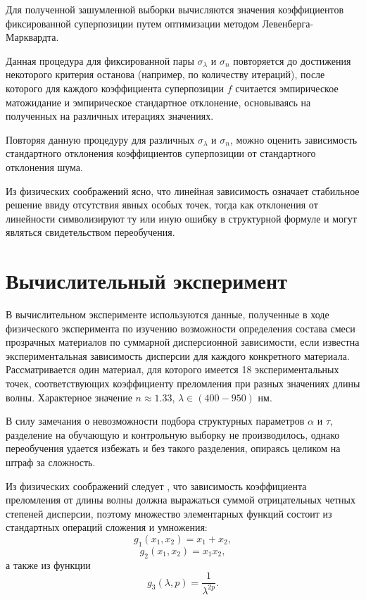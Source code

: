 \documentclass[12pt,a4paper]{article}
\begin{document}
Для полученной зашумленной выборки вычисляются значения коэффициентов фиксированной
суперпозиции путем оптимизации методом Левенберга-Марквардта.

Данная процедура для фиксированной пары $\sigma_{\lambda}$ и $\sigma_n$ повторяется
до достижения некоторого критерия останова (например, по количеству итераций),
после которого для каждого коэффициента суперпозиции $f$ считается эмпирическое
матожидание и эмпирическое стандартное отклонение, основываясь на полученных на
различных итерациях значениях.

Повторяя данную процедуру для различных $\sigma_{\lambda}$ и $\sigma_n$, можно
оценить зависимость стандартного отклонения коэффициентов суперпозиции от
стандартного отклонения шума.

Из физических соображений ясно, что линейная зависимость означает стабильное решение
ввиду отсутствия явных особых точек, тогда как отклонения от линейности символизируют
ту или иную ошибку в структурной формуле и могут являться свидетельством переобучения.

\section{Вычислительный эксперимент}

В вычислительном эксперименте используются данные, полученные в ходе
физического эксперимента по изучению возможности определения состава смеси
прозрачных материалов по суммарной дисперсионной зависимости, если известна экспериментальная
зависимость дисперсии для каждого конкретного материала. Рассматривается один
материал, для которого имеется 18 экспериментальных точек,
соответствующих коэффициенту преломления при разных значениях длины волны.
Характерное значение $n \approx 1.33$, $\lambda \in (400-950)$ нм.

В силу замечания о невозможности подбора структурных параметров $\alpha$ и $\tau$,
разделение на обучающую и контрольную выборку не производилось, однако переобучения
удается избежать и без такого разделения, опираясь целиком на штраф за сложность.

Из физических соображений следует \cite{Serova11}, что зависимость коэффициента преломления
от длины волны должна выражаться суммой отрицательных четных степеней дисперсии,
поэтому множество элементарных функций состоит из стандартных операций сложения и умножения:
\[
  g_1(x_1, x_2) = x_1 + x_2,
\]
\[
  g_2(x_1, x_2) = x_1 x_2,
\]
а также из функции
\[
  g_3(\lambda, p) = \frac{1}{\lambda^{2p}}.
\]
\end{document}
